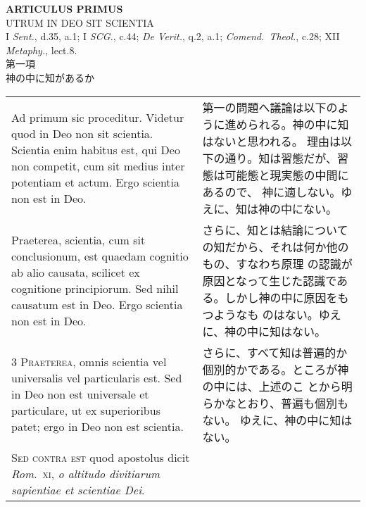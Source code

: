 \documentclass[10pt]{jsarticle} %
\begin{document}
\newpage
{}
\begin{center}
{\Large {\bfseries ARTICULUS PRIMUS}}\\
{\large UTRUM IN DEO SIT SCIENTIA}\\
{\footnotesize I {\itshape Sent.}, d.35, a.1; I {\itshape SCG.}, c.44; {\itshape De Verit.}, q.2, a.1; {\itshape Comend.~Theol.}, c.28; XII {\itshape Metaphy.}, lect.8.}\\
{\Large 第一項\\神の中に知があるか}
\end{center}

\begin{longtable}{p{21em}p{21em}}

{\huge A}{\sc d primum sic proceditur}.  Videtur quod in Deo non sit
scientia. Scientia enim habitus est, qui Deo non competit, cum sit
medius inter potentiam et actum. Ergo scientia non est in Deo.

&

第一の問題へ議論は以下のように進められる。神の中に知はないと思われる。
理由は以下の通り。知は習態だが、習態は可能態と現実態の中間にあるので、
神に適しない。ゆえに、知は神の中にない。

\\

{\sc 2 Praeterea}, scientia, cum sit conclusionum, est quaedam
cognitio ab alio causata, scilicet ex cognitione principiorum. Sed
nihil causatum est in Deo. Ergo scientia non est in Deo.

&

さらに、知とは結論についての知だから、それは何か他のもの、すなわち原理
の認識が原因となって生じた認識である。しかし神の中に原因をもつようなも
のはない。ゆえに、神の中に知はない。

\\

{\scshape 3 Praeterea}, omnis scientia vel universalis vel
particularis est. Sed in Deo non est universale et particulare, ut ex
superioribus patet; ergo in Deo non est scientia.

&

さらに、すべて知は普遍的か個別的かである。ところが神の中には、上述のこ
とから明らかなとおり、普遍も個別もない。 ゆえに、神の中に知はない。

\\

{\scshape Sed contra est} quod apostolus dicit {\itshape
Rom}.~{\scshape xi}, {\itshape o altitudo divitiarum sapientiae et
scientiae Dei}.


\end{longtable}
\end{document}

